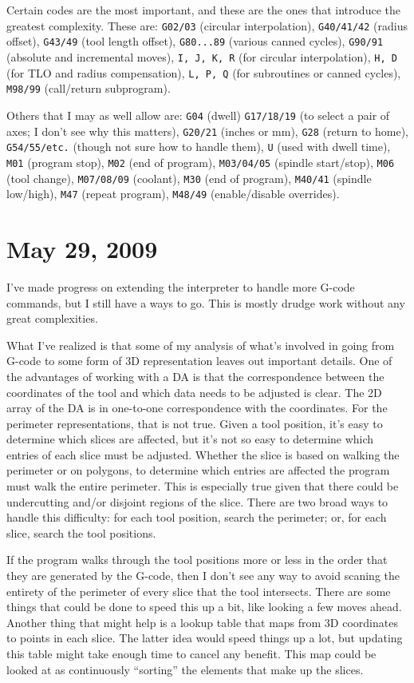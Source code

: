 \documentclass[titlepage,oneside,10pt]{article}
\begin{document}
Certain codes are the most important, and these are the ones that
introduce the greatest complexity. These are: {\tt G02/03} (circular
interpolation), {\tt G40/41/42} (radius offset), {\tt G43/49} (tool
length offset), {\tt G80...89} (various canned cycles), {\tt G90/91}
(absolute and incremental moves), {\tt I, J, K, R} (for circular
 interpolation), {\tt H, D} (for TLO and radius compensation),
{\tt L, P, Q} (for subroutines or canned cycles), {\tt M98/99}
(call/return subprogram).

Others that I may as well allow are: {\tt G04} (dwell) {\tt G17/18/19}
(to select a pair of axes; I don't see why this matters), {\tt G20/21}
(inches or mm), {\tt G28} (return to home), {\tt G54/55/etc.} (though
not sure how to handle them), {\tt U} (used with dwell time), 
{\tt M01} (program stop), {\tt M02} (end of program), {\tt M03/04/05}
(spindle start/stop), {\tt M06} (tool change), {\tt M07/08/09}
(coolant), {\tt M30} (end of program), {\tt M40/41} (spindle low/high),
{\tt M47} (repeat program), {\tt M48/49} (enable/disable overrides).

\section{May 29, 2009}

I've made progress on extending the interpreter to handle more G-code
commands, but I still have a ways to go. This is mostly drudge work
without any great complexities. 

What I've realized is that some of my analysis of what's involved in
going from G-code to some form of 3D representation leaves out
important details. One of the advantages of working with a DA is that
the correspondence between the coordinates of the tool and which data
needs to be adjusted is clear. The 2D array of the DA is in one-to-one
correspondence with the coordinates. For the perimeter
representations, that is not true. Given a tool position, it's easy to
determine which slices are affected, but it's not so easy to determine
which entries of each slice must be adjusted. Whether the slice is
based on walking the perimeter or on polygons, to determine which
entries are affected the program must walk the entire perimeter. This
is especially true given that there could be undercutting and/or
disjoint regions of the slice. There are two broad ways to handle this
difficulty: for each tool position, search the perimeter; or, for each
slice, search the tool positions. 

If the program walks through the tool positions more or less in the
order that they are generated by the G-code, then I don't see any way to avoid
scaning the entirety of the perimeter of every slice that the tool
intersects. There are some things that could be done to speed this up
a bit, like looking a few moves ahead. Another thing that might help
is a lookup table that maps from 3D coordinates to points in each
slice. The latter idea would speed things up a lot, but updating this
table might take enough time to cancel any benefit. This map could be
looked at as continuously ``sorting'' the elements that make up the
slices.
\end{document}
